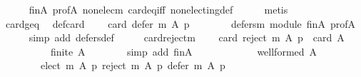 \begin{isabellebody}
\ \ \ \ \isamarkupfalse%
\ fin{\isacharunderscore}{\kern0pt}A\ prof{\isacharunderscore}{\kern0pt}A\ non{\isacharunderscore}{\kern0pt}elec{\isacharunderscore}{\kern0pt}m\ card{\isacharunderscore}{\kern0pt}eq{\isacharunderscore}{\kern0pt}{}{\isacharunderscore}{\kern0pt}iff\ non{\isacharunderscore}{\kern0pt}electing{\isacharunderscore}{\kern0pt}def\isanewline
\ \ \ \ \isamarkupfalse%
\ metis\isanewline
\ \ \isamarkupfalse%
\isanewline
\ \ \isamarkupfalse%
\ card{\isacharunderscore}{\kern0pt}geq{\isacharunderscore}{\kern0pt}{}\ \isamarkupfalse%
\ def{\isacharunderscore}{\kern0pt}card{\isacharunderscore}{\kern0pt}{}{\isacharcolon}{\kern0pt}\isanewline
\ \ \ \ {\isachardoublequoteopen}card\ {\isacharparenleft}{\kern0pt}defer\ m\ A\ p{\isacharparenright}{\kern0pt}\ {\isacharequal}{\kern0pt}\ {}{\isachardoublequoteclose}\isanewline
\ \ \ \ \isamarkupfalse%
\ defers{\isacharunderscore}{\kern0pt}m{\isacharunderscore}{\kern0pt}{}\ module\ fin{\isacharunderscore}{\kern0pt}A\ prof{\isacharunderscore}{\kern0pt}A\isanewline
\ \ \ \ \isamarkupfalse%
\ {\isacharparenleft}{\kern0pt}simp\ add{\isacharcolon}{\kern0pt}\ defers{\isacharunderscore}{\kern0pt}def{\isacharparenright}{\kern0pt}\isanewline
\ \ \isamarkupfalse%
\ \isamarkupfalse%
\ card{\isacharunderscore}{\kern0pt}reject{\isacharunderscore}{\kern0pt}m{\isacharcolon}{\kern0pt}\isanewline
\ \ \ \ {\isachardoublequoteopen}card\ {\isacharparenleft}{\kern0pt}reject\ m\ A\ p{\isacharparenright}{\kern0pt}\ {\isacharequal}{\kern0pt}\ card\ A\ {\isacharminus}{\kern0pt}\ {}{\isachardoublequoteclose}\isanewline
\ \ \isamarkupfalse%
\ {\isacharminus}{\kern0pt}\isanewline
\ \ \ \ \isamarkupfalse%
\ {\isachardoublequoteopen}finite\ A{\isachardoublequoteclose}\isanewline
\ \ \ \ \ \ \isamarkupfalse%
\ {\isacharparenleft}{\kern0pt}simp\ add{\isacharcolon}{\kern0pt}\ fin{\isacharunderscore}{\kern0pt}A{\isacharparenright}{\kern0pt}\isanewline
\ \ \ \ \isamarkupfalse%
\ \isamarkupfalse%
\isanewline
\ \ \ \ \ \ {\isachardoublequoteopen}well{\isacharunderscore}{\kern0pt}formed\ A\isanewline
\ \ \ \ \ \ \ \ {\isacharparenleft}{\kern0pt}elect\ m\ A\ p{\isacharcomma}{\kern0pt}\ reject\ m\ A\ p{\isacharcomma}{\kern0pt}\ defer\ m\ A\ p{\isacharparenright}{\kern0pt}{\isachardoublequoteclose}\isanewline
\ \ \ \ \ \ \isamarkupfalse%

\end{isabellebody}
